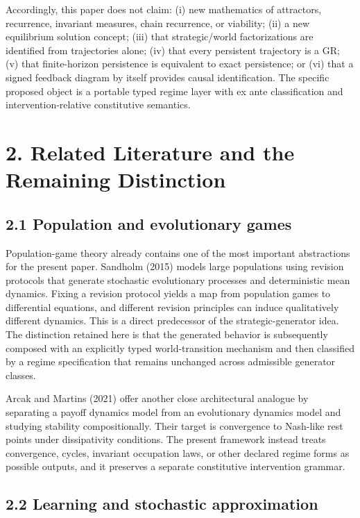 \documentclass[10pt]{article}
\begin{document}
Accordingly, this paper does not claim: (i) new mathematics of
attractors, recurrence, invariant measures, chain recurrence, or
viability; (ii) a new equilibrium solution concept; (iii) that
strategic/world factorizations are identified from trajectories alone;
(iv) that every persistent trajectory is a GR; (v) that finite-horizon
persistence is equivalent to exact persistence; or (vi) that a signed
feedback diagram by itself provides causal identification. The specific
proposed object is a portable typed regime layer with ex ante
classification and intervention-relative constitutive semantics.

\section{2. Related Literature and the Remaining
Distinction}\label{related-literature-and-the-remaining-distinction}

\subsection{2.1 Population and evolutionary
games}\label{population-and-evolutionary-games}

Population-game theory already contains one of the most important
abstractions for the present paper. Sandholm (2015) models large
populations using revision protocols that generate stochastic
evolutionary processes and deterministic mean dynamics. Fixing a
revision protocol yields a map from population games to differential
equations, and different revision principles can induce qualitatively
different dynamics. This is a direct predecessor of the
strategic-generator idea. The distinction retained here is that the
generated behavior is subsequently composed with an explicitly typed
world-transition mechanism and then classified by a regime specification
that remains unchanged across admissible generator classes.

Arcak and Martins (2021) offer another close architectural analogue by
separating a payoff dynamics model from an evolutionary dynamics model
and studying stability compositionally. Their target is convergence to
Nash-like rest points under dissipativity conditions. The present
framework instead treats convergence, cycles, invariant occupation laws,
or other declared regime forms as possible outputs, and it preserves a
separate constitutive intervention grammar.

\subsection{2.2 Learning and stochastic
approximation}\label{learning-and-stochastic-approximation}
\end{document}
